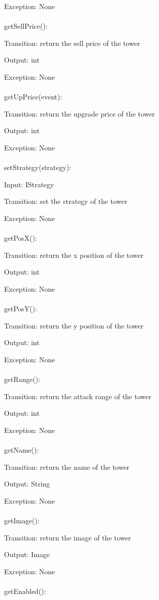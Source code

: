 \documentclass[12,english]{article}
\begin{document}
		Exception: None\\
		\\
		getSellPrice():
		
		Transition: return the sell price of the tower
		
		Output: int
		
		Exception: None\\
		\\
		getUpPrice(event):
		
		Transition: return the upgrade price of the tower
		
		Output: int
		
		Exception: None\\
		\\
		setStrategy(strategy):
		
		Input: IStrategy
		
		Transition: set the strategy of the tower
		
		Exception: None\\
		\\
		getPosX():
		
		Transition: return the x position of the tower
		
		Output: int
		
		Exception: None\\
		\\
		getPosY():
		
		Transition: return the y position of the tower
		
		Output: int
		
		Exception: None\\
		\\
		getRange():
		
		Transition: return the attack range of the tower
		
		Output: int
		
		Exception: None\\
		\\
		getName():
		
		Transition: return the name of the tower
		
		Output: String
		
		Exception: None\\
		\\
		getImage():
		
		Transition: return the image of the tower
		
		Output: Image
		
		Exception: None\\
		\\
		getEnabled():
		
\end{document}

